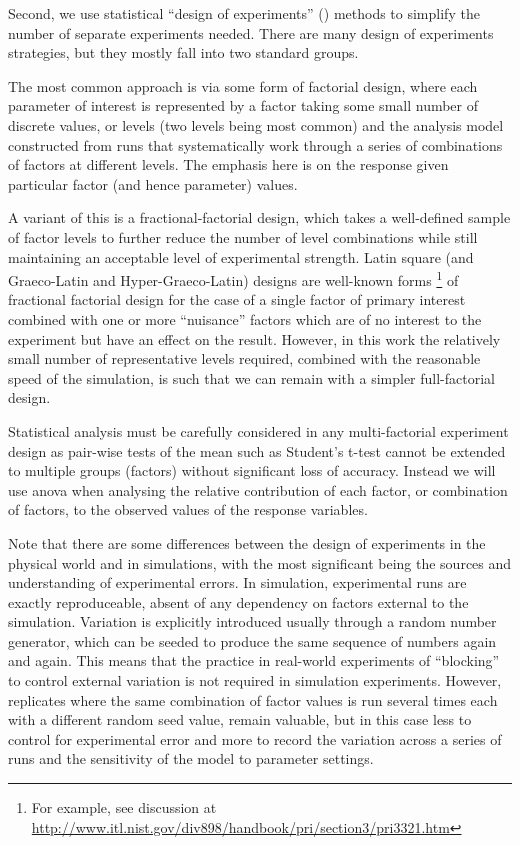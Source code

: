 Second, we use statistical ``design of experiments'' (\eg \cite{Montgomery2009}) methods to simplify the number of separate experiments needed. There are many design of experiments strategies, but they mostly fall into two standard groups. 

The most common approach is via some form of factorial design, where each parameter of interest is represented by a factor taking some small number of discrete values, or levels (two levels being most common) and the analysis model constructed from runs that systematically work through a series of combinations of factors at different levels. The emphasis here is on the response given particular factor (and hence parameter) values. 

A variant of this is a fractional-factorial design, which takes a well-defined sample of factor levels to further reduce the number of level combinations while still maintaining an acceptable level of experimental strength. Latin square (and Graeco-Latin and Hyper-Graeco-Latin) designs are well-known forms \footnote{For example, see discussion at \url{http://www.itl.nist.gov/div898/handbook/pri/section3/pri3321.htm}} of fractional factorial design for the case of a single factor of primary interest combined with one or more ``nuisance'' factors which are of no interest to the experiment but have an effect on the result. However, in this work the relatively small number of representative levels required, combined with the reasonable speed of the simulation, is such that we can remain with a simpler full-factorial design.

Statistical analysis must be carefully considered in any multi-factorial experiment design as pair-wise tests of the mean such as Student's t-test cannot be extended to multiple groups (factors) without significant loss of accuracy. Instead we will use \gls{anova} when analysing the relative contribution of each factor, or combination of factors, to the observed values of the response variables.

Note that there are some differences between the design of experiments in the physical world and in simulations, with the most significant being the sources and understanding of experimental errors. In simulation, experimental runs are exactly reproduceable, absent of any dependency on factors external to the simulation. Variation is explicitly introduced usually through a random number generator, which can be seeded to produce the same sequence of numbers again and again. This means that the practice in real-world experiments of ``blocking'' to control external variation is not required in simulation experiments. However, \gls{replicate}s where the same combination of factor values is run several times each with a different random seed value, remain valuable, but in this case less to control for experimental error and more to record the variation across a series of runs and the sensitivity of the model to parameter settings.

